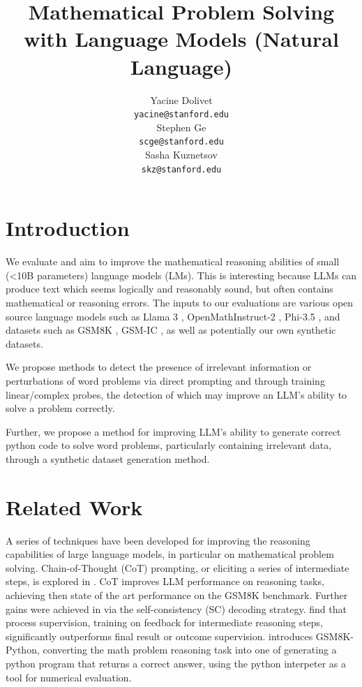 \documentclass{article}
\title{Mathematical Problem Solving with Language Models (Natural Language)
}
\author{
  Yacine Dolivet\\
  \texttt{yacine@stanford.edu} \\
  \And
  Stephen Ge\\
  \texttt{scge@stanford.edu} \\
   \And
  Sasha Kuznetsov\\
  \texttt{skz@stanford.edu} \\
}
\begin{document}
\maketitle




\section{Introduction}
We evaluate and aim to improve the mathematical reasoning abilities of small (<10B parameters) language models (LMs). This is interesting because LLMs can produce text which seems logically and reasonably sound, but often contains mathematical or reasoning errors. The inputs to our evaluations are various open source language models such as Llama 3 \citep{dubey}, OpenMathInstruct-2 \citep{toshniwal}, Phi-3.5 \citep{abdin}, and datasets such as GSM8K \citep{cobbe}, GSM-IC \citep{shi}, as well as potentially our own synthetic datasets.

We propose methods to detect the presence of irrelevant information or perturbations of word problems via direct prompting and through training linear/complex probes, the detection of which may improve an LLM's ability to solve a problem correctly. 

Further, we propose a method for improving LLM's ability to generate correct python code to solve word problems, particularly containing irrelevant data, through a synthetic dataset generation method. 

\section{Related Work}
A series of techniques have been developed for improving the reasoning capabilities of large language models, in particular on mathematical problem solving. Chain-of-Thought (CoT) prompting, or eliciting a series of intermediate steps, is explored in \citep{wei}. CoT improves LLM performance on reasoning tasks, achieving then state of the art performance on the GSM8K benchmark. Further gains were achieved in \citep{wang} via the self-consistency (SC) decoding strategy. \citep{lightman} find that process supervision, training on feedback for intermediate reasoning steps, significantly outperforms final result or outcome supervision. \citep{chowdhery} introduces GSM8K-Python, converting the math problem reasoning task into one of generating a python program that returns a correct answer, using the python interpeter as a tool for numerical evaluation.
\end{document}
